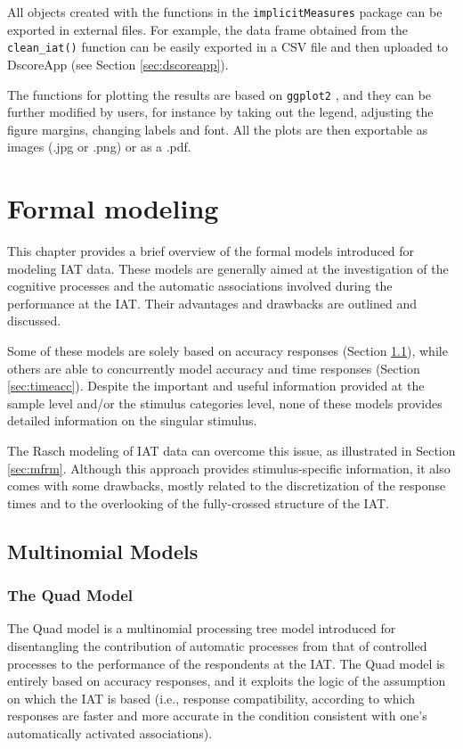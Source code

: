 \documentclass[12pt]{book}
\begin{document}

All objects created with the functions in the \verb*|implicitMeasures| package can be exported in external files. For example, the data frame obtained from the \verb*|clean_iat()| function can be easily exported in a CSV file and then uploaded to DscoreApp (see Section \ref{sec:dscoreapp}).  

The functions for plotting the results are based on \verb*|ggplot2| \cite{ggplot2}, and they can be further modified by users, for instance by taking out the legend, adjusting the figure margins, changing labels and font. All the plots are then exportable as images (.jpg or .png) or as a .pdf.


\chapter{Formal modeling}\label{chap:formalModel}

This chapter provides a brief overview of the formal models introduced for modeling IAT data. 
These models are generally aimed at the investigation of the cognitive processes and the automatic associations involved during the performance at the IAT. Their advantages and drawbacks are outlined and discussed.

Some of these models  are solely based on accuracy responses (Section \ref{sec:multimodel}), while others are able to concurrently model accuracy and time responses (Section \ref{sec:timeacc}).
Despite the important and useful information provided at the sample level and/or the stimulus categories level, none of these models provides detailed information on the singular stimulus.

The Rasch modeling of IAT data can overcome this issue, as illustrated in Section \ref{sec:mfrm}. Although this approach provides stimulus-specific information, it also comes with some drawbacks, mostly related to the discretization of the response times and to the overlooking of the fully-crossed structure of the IAT.


\section{Multinomial Models}\label{sec:multimodel}
\subsection{The Quad Model}\label{sub:quad}
The Quad model \cite{Conrey2005} is a multinomial processing tree model introduced for disentangling the contribution of automatic processes from that of controlled processes to the performance of the respondents at the IAT. 
The Quad model is entirely based on accuracy responses, and it exploits the logic of the assumption on which the IAT is based (i.e., response compatibility, according to which responses are faster and more accurate in the condition consistent with one's automatically activated associations). 
\end{document}
